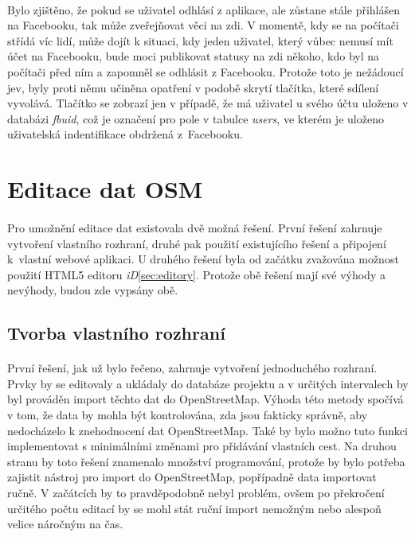 \documentclass[11pt,a4paper,titlepage,oneside]{book}
\begin{document}
				\paragraph{} Bylo zjištěno, že pokud se uživatel odhlásí z aplikace, ale zůstane stále přihlášen na Facebooku, tak může zveřejňovat věci na zdi. V momentě, kdy se na počítači střídá víc lidí, může dojít k situaci, kdy jeden uživatel, který vůbec nemusí mít účet na Facebooku, bude moci publikovat statusy na zdi někoho, kdo byl na počítači před ním a zapomněl se odhlásit z Facebooku. Protože toto je nežádoucí jev, byly proti němu učiněna opatření v podobě skrytí tlačítka, které sdílení vyvolává. Tlačítko se zobrazí jen v případě, že má uživatel u svého účtu uloženo v databázi \textit{fbuid}, což je označení pro pole v tabulce \textit{users}, ve kterém je uloženo uživatelská indentifikace obdržená z~Facebooku.
		

		\section{Editace dat OSM}


				\paragraph{} Pro umožnění editace dat existovala dvě možná řešení. První řešení zahrnuje vytvoření vlastního rozhraní, druhé pak použití existujícího řešení a připojení k~vlastní webové aplikaci. U druhého řešení byla od začátku zvažována možnost použití HTML5 editoru \textit{iD}\ref{sec:editory}. Protože obě řešení mají své výhody a nevýhody, budou zde vypsány obě.
			\subsection{Tvorba vlastního rozhraní}
				\paragraph{} První řešení, jak už bylo řečeno, zahrnuje vytvoření jednoduchého rozhraní. Prvky by se editovaly a  ukládaly do databáze projektu a v určitých intervalech by byl prováděn import těchto dat do OpenStreetMap. Výhoda této metody spočívá v tom, že data by mohla být kontrolována, zda jsou fakticky správně, aby nedocházelo k znehodnocení dat OpenStreetMap. Také by bylo možno tuto funkci implementovat s minimálními změnami pro přidávání vlastních cest. Na druhou stranu by toto řešení znamenalo množství programování, protože by bylo potřeba zajistit nástroj pro import do OpenStreetMap, popřípadně data importovat ručně. V začátcích by to pravdě\-podobně nebyl problém, ovšem po překročení určitého počtu editací by se mohl stát ruční import nemožným nebo alespoň velice náročným na čas.
\end{document}

